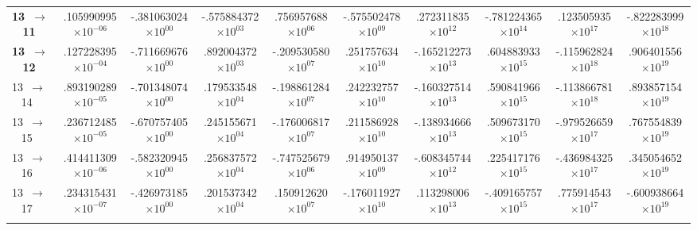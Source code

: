\documentclass[reviewcopy]{elsarticle}
\begin{document}
\begin{landscape}
\begin{longtable}{lccccccccc}
{\bf 13~$\to$~ 11}  &   .105990995$\times10^{-06}$ & -.381063024$\times10^{ 00}$ & -.575884372$\times10^{ 03}$ &  .756957688$\times10^{ 06}$ & -.575502478$\times10^{ 09}$ &  .272311835$\times10^{ 12}$ & -.781224365$\times10^{ 14}$ &  .123505935$\times10^{ 17}$ & -.822283999$\times10^{ 18}$ \\
{\bf 13~$\to$~ 12}  &   .127228395$\times10^{-04}$ & -.711669676$\times10^{ 00}$ &  .892004372$\times10^{ 03}$ & -.209530580$\times10^{ 07}$ &  .251757634$\times10^{ 10}$ & -.165212273$\times10^{ 13}$ &  .604883933$\times10^{ 15}$ & -.115962824$\times10^{ 18}$ &  .906401556$\times10^{ 19}$ \\
 13~$\to$~ 14  &   .893190289$\times10^{-05}$ & -.701348074$\times10^{ 00}$ &  .179533548$\times10^{ 04}$ & -.198861284$\times10^{ 07}$ &  .242232757$\times10^{ 10}$ & -.160327514$\times10^{ 13}$ &  .590841966$\times10^{ 15}$ & -.113866781$\times10^{ 18}$ &  .893857154$\times10^{ 19}$ \\
 13~$\to$~ 15  &   .236712485$\times10^{-05}$ & -.670757405$\times10^{ 00}$ &  .245155671$\times10^{ 04}$ & -.176006817$\times10^{ 07}$ &  .211586928$\times10^{ 10}$ & -.138934666$\times10^{ 13}$ &  .509673170$\times10^{ 15}$ & -.979526659$\times10^{ 17}$ &  .767554839$\times10^{ 19}$ \\
 13~$\to$~ 16  &   .414411309$\times10^{-06}$ & -.582320945$\times10^{ 00}$ &  .256837572$\times10^{ 04}$ & -.747525679$\times10^{ 06}$ &  .914950137$\times10^{ 09}$ & -.608345744$\times10^{ 12}$ &  .225417176$\times10^{ 15}$ & -.436984325$\times10^{ 17}$ &  .345054652$\times10^{ 19}$ \\
 13~$\to$~ 17  &   .234315431$\times10^{-07}$ & -.426973185$\times10^{ 00}$ &  .201537342$\times10^{ 04}$ &  .150912620$\times10^{ 07}$ & -.176011927$\times10^{ 10}$ &  .113298006$\times10^{ 13}$ & -.409165757$\times10^{ 15}$ &  .775914543$\times10^{ 17}$ & -.600938664$\times10^{ 19}$\\[3pt]
\hline \\
\end{longtable}
\normalsize
\renewcommand{\thefootnote}{\arabic{footnote}}
\renewcommand{\arraystretch}{1.0}
\end{landscape}

\newpage
\end{document}
